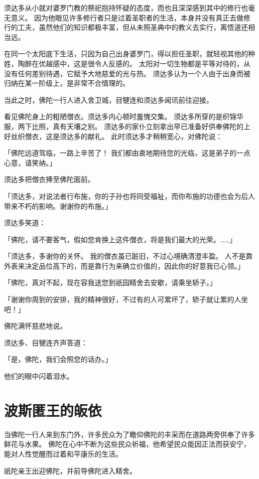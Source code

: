 \documentclass[twoside,openany]{book}
\begin{document}
须达多从小就对婆罗门教的祭祀抱持怀疑的态度，而也且深深感到其中的修行也毫无意义。
因为他眼见许多修行者只是过着圣职者的生活，本身并没有真正去做修行的工夫，虽然他们的知识都极丰富，但从未照圣典中的教义去实行，离悟道还相当远。

在同一个太阳底下生活，只因为自己出身婆罗门，得以担任圣职，就轻视其他的种姓，陶醉在优越感中，这是很令人反感的。
太阳对一切生物都是平等对待的，从没有任何差别待遇，它赋予大地慈爱的光与热。
须达多认为一个人由于出身而被归纳在某一阶级上，是非常不合情理的。

当此之时，佛陀一行人进入舍卫城，目犍连和须达多闻讯前往迎接。

看见佛陀身上的粗陋僧衣。须达多内心顿时羞愧交集。
须达多所穿的是织锦华服，两下比照，真有天壤之别。
须达多的家仆立刻拿出早已准备好供奉佛陀的上好丝织僧衣，这是须达多的献礼。
此时须达多才稍稍宽心，对佛陀说：

「佛陀远道驾临，一路上辛苦了！
我们都由衷地期待您的光临，这是弟子的一点心意，请笑纳。」

须达多把僧衣捧至佛陀面前。

「须达多，对说法者行布施，你的子孙也将同受福祉，而你布施的功德也会为后人带来不朽的影响。谢谢你的布施。」

须达多笑道：

「佛陀，请不要客气，假如您肯换上这件僧衣，将是我们最大的光荣。……」

「须达多，多谢你的关怀。
我的僧衣虽已脏旧，不过心境确清澄丰盈。
人不是靠外表来决定品位高下的，而是靠行为来确立价值的，因此你的好意我已心领。」

「佛陀，真对不起，现在容我送您到祇园精舍去安歇，请乘坐轿子。」

「谢谢你周到的安排，我的精神很好，不过有的人可累坏了，轿子就让累的人坐吧！」

佛陀满怀慈悲地说。

须达多、目犍连齐声答道：

「是，佛陀，我们会照您的话办。」

他们的眼中闪着泪水。

\section{波斯匿王的皈依}\label{sec6.6}

当佛陀一行人来到东门外，许多民众为了瞻仰佛陀的丰采而在道路两旁供奉了许多鲜花与水果。
佛陀在心中不断为这些民众祈福，他希望民众能因正法而获安宁，能对人性觉醒而过着和平康乐的生活。

祇陀亲王出迎佛陀，并前导佛陀进入精舍。
\end{document}
